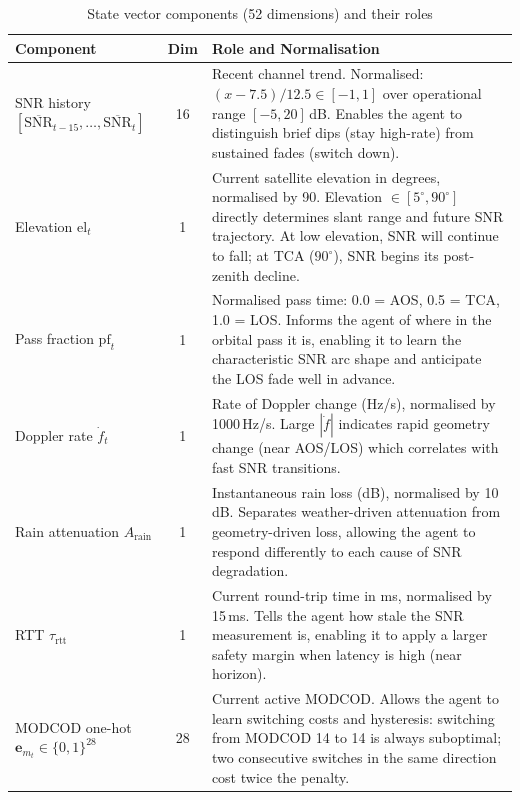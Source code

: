 \documentclass[12pt,a4paper]{report}
\begin{document}
\begin{table}[H]
\centering
\caption{State vector components (52 dimensions) and their roles}
\label{tab:state}
\begin{tabular}{p{4.2cm}cp{7.3cm}}
\toprule
\textbf{Component} & \textbf{Dim} & \textbf{Role and Normalisation} \\
\midrule
SNR history $[\overline{\text{SNR}}_{t-15},\ldots,\overline{\text{SNR}}_t]$
  & 16 & Recent channel trend. Normalised: $(x - 7.5)/12.5 \in [-1, 1]$
         over operational range $[-5, 20]$\,dB. Enables the agent to
         distinguish brief dips (stay high-rate) from sustained fades
         (switch down). \\[4pt]
Elevation $\text{el}_t$
  & 1  & Current satellite elevation in degrees, normalised by 90.
         Elevation $\in [5^\circ, 90^\circ]$ directly determines slant range
         and future SNR trajectory. At low elevation, SNR will continue to
         fall; at TCA ($90^\circ$), SNR begins its post-zenith decline. \\[4pt]
Pass fraction $\text{pf}_t$
  & 1  & Normalised pass time: 0.0 = AOS, 0.5 = TCA, 1.0 = LOS.
         Informs the agent of where in the orbital pass it is, enabling
         it to learn the characteristic SNR arc shape and anticipate
         the LOS fade well in advance. \\[4pt]
Doppler rate $\dot{f}_t$
  & 1  & Rate of Doppler change (Hz/s), normalised by 1000\,Hz/s.
         Large $|\dot{f}|$ indicates rapid geometry change (near AOS/LOS)
         which correlates with fast SNR transitions. \\[4pt]
Rain attenuation $A_\text{rain}$
  & 1  & Instantaneous rain loss (dB), normalised by 10\,dB.
         Separates weather-driven attenuation from geometry-driven loss,
         allowing the agent to respond differently to each cause of SNR
         degradation. \\[4pt]
RTT $\tau_\text{rtt}$
  & 1  & Current round-trip time in ms, normalised by 15\,ms.
         Tells the agent how stale the SNR measurement is, enabling
         it to apply a larger safety margin when latency is high
         (near horizon). \\[4pt]
MODCOD one-hot $\mathbf{e}_{m_t} \in \{0,1\}^{28}$
  & 28 & Current active MODCOD. Allows the agent to learn switching
         costs and hysteresis: switching from MODCOD 14 to 14 is always
         suboptimal; two consecutive switches in the same direction cost
         twice the penalty. \\[4pt]

\end{tabular}
\end{table}
\end{document}
